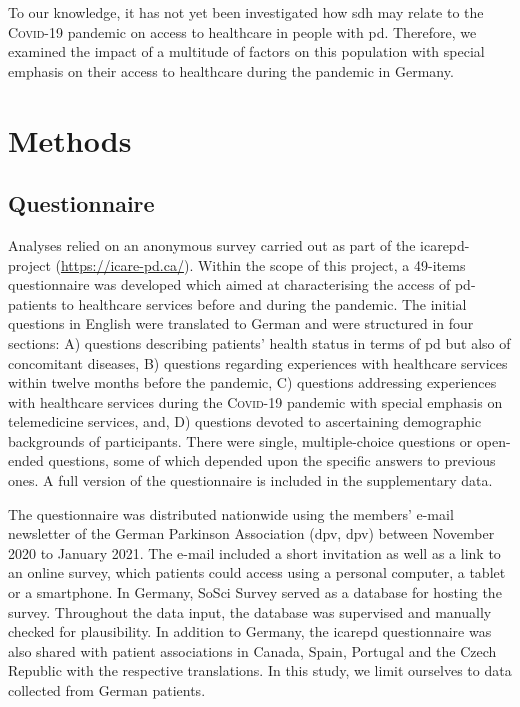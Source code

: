 \documentclass{bmcart}
\begin{document}
To our knowledge, it has not yet been investigated how \ac{sdh} may relate to the \textsc{Covid}-19 pandemic on access to healthcare in people with \ac{pd}. Therefore, we examined the impact of a multitude of factors on this population with special emphasis on their access to healthcare during the pandemic in Germany. 

\newpage

\section*{Methods}
\subsection*{Questionnaire}
Analyses relied on an anonymous survey carried out as part of the \ac{icarepd}-project (\url{https://icare-pd.ca/}). Within the scope of this project, a 49-items questionnaire was developed which aimed at characterising the access of \ac{pd}-patients to healthcare services before and during the pandemic. The initial questions in English were translated to German and were structured in four sections: A) questions describing patients' health status in terms of \ac{pd} but also of concomitant diseases, B) questions regarding experiences with healthcare services within twelve months before the pandemic, C) questions addressing experiences with healthcare services during the \textsc{Covid}-19 pandemic with special emphasis on telemedicine services, and, D) questions devoted to ascertaining demographic backgrounds of participants. There were single, multiple-choice questions or open-ended questions, some of which depended upon the specific answers to previous ones. A full version of the questionnaire is included in the supplementary data. 

The questionnaire was distributed nationwide using the members’ e-mail newsletter of the German Parkinson Association (\acl{dpv}, \acs{dpv}) between November 2020 to January 2021. The e-mail included a short invitation as well as a link to an online survey, which patients could access using a personal computer, a tablet or a smartphone. In Germany, SoSci Survey \cite{leiner2019sosci} served as a database for hosting the survey. Throughout the data input, the database was supervised and manually checked for plausibility. In addition to Germany, the \ac{icarepd} questionnaire was also shared with patient associations in Canada, Spain, Portugal and the Czech Republic with the respective translations. In this study, we limit ourselves to data collected from German patients. 
\end{document}
